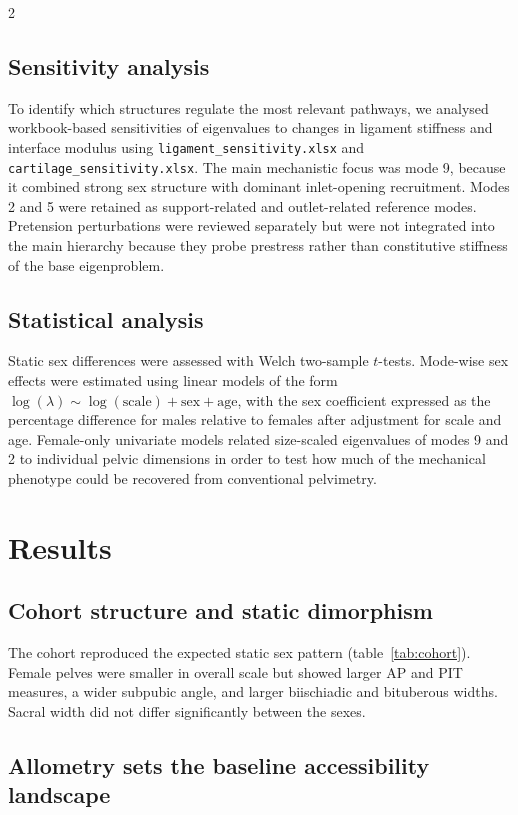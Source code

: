 \documentclass[openacc]{rsproca_new}
\begin{document}
\begin{multicols}{2}
\subsection{Sensitivity analysis}

To identify which structures regulate the most relevant pathways, we analysed workbook-based sensitivities of eigenvalues to changes in ligament stiffness and interface modulus using \texttt{ligament\_sensitivity.xlsx} and \texttt{cartilage\_sensitivity.xlsx}. The main mechanistic focus was mode 9, because it combined strong sex structure with dominant inlet-opening recruitment. Modes 2 and 5 were retained as support-related and outlet-related reference modes. Pretension perturbations were reviewed separately but were not integrated into the main hierarchy because they probe prestress rather than constitutive stiffness of the base eigenproblem.

\subsection{Statistical analysis}

Static sex differences were assessed with Welch two-sample $t$-tests. Mode-wise sex effects were estimated using linear models of the form $\log(\lambda) \sim \log(\mathrm{scale}) + \mathrm{sex} + \mathrm{age}$, with the sex coefficient expressed as the percentage difference for males relative to females after adjustment for scale and age. Female-only univariate models related size-scaled eigenvalues of modes 9 and 2 to individual pelvic dimensions in order to test how much of the mechanical phenotype could be recovered from conventional pelvimetry.

\section{Results}

\subsection{Cohort structure and static dimorphism}

The cohort reproduced the expected static sex pattern (table~\ref{tab:cohort}). Female pelves were smaller in overall scale but showed larger AP and PIT measures, a wider subpubic angle, and larger biischiadic and bituberous widths. Sacral width did not differ significantly between the sexes.

\subsection{Allometry sets the baseline accessibility landscape}


\end{multicols}
\end{document}
